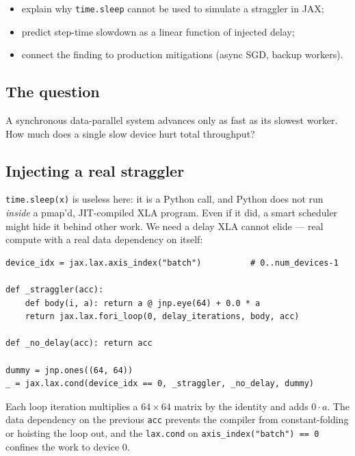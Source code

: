 \documentclass[11pt,a4paper]{article}
\begin{document}
\begin{objectives}
\begin{itemize}[leftmargin=*, itemsep=1pt]
    \item explain why \texttt{time.sleep} cannot be used to simulate a straggler in JAX;
    \item predict step-time slowdown as a linear function of injected delay;
    \item connect the finding to production mitigations (async SGD, backup workers).
\end{itemize}
\end{objectives}

\subsection{The question}

A synchronous data-parallel system advances only as fast as its slowest worker. How much
does a single slow device hurt total throughput?

\subsection{Injecting a real straggler}

\texttt{time.sleep(x)} is useless here: it is a Python call, and Python does not run
\emph{inside} a pmap'd, JIT-compiled XLA program. Even if it did, a smart scheduler might
hide it behind other work. We need a delay XLA cannot elide --- real compute with a real
data dependency on itself:

\begin{lstlisting}[style=py]
device_idx = jax.lax.axis_index("batch")          # 0..num_devices-1

def _straggler(acc):
    def body(i, a): return a @ jnp.eye(64) + 0.0 * a
    return jax.lax.fori_loop(0, delay_iterations, body, acc)

def _no_delay(acc): return acc

dummy = jnp.ones((64, 64))
_ = jax.lax.cond(device_idx == 0, _straggler, _no_delay, dummy)
\end{lstlisting}

Each loop iteration multiplies a $64 \times 64$ matrix by the identity and adds $0 \cdot a$.
The data dependency on the previous \texttt{acc} prevents the compiler from constant-folding
or hoisting the loop out, and the \texttt{lax.cond} on \texttt{axis\_index("batch") == 0}
confines the work to device 0.
\end{document}
